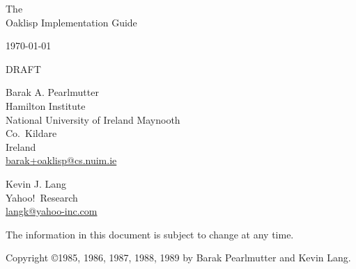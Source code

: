 %
%
%


\begin{titlepage}

\begin{center}

\vspace*{1in}

\Huge
 The \\
 Oaklisp Implementation Guide \\

\vspace{.5in}

\large
 \today \\

\vspace{.25in}

\Huge
 DRAFT \\

\vspace{.5in}

\Large
 Barak A. Pearlmutter \\
\large
 Hamilton Institute\\
 National University of Ireland Maynooth\\
 Co.\ Kildare\\
 Ireland\\
 \url{barak+oaklisp@cs.nuim.ie}

\vspace{.5in}

\Large
 Kevin J. Lang \\
\large
 Yahoo!\ Research \\
 \url{langk@yahoo-inc.com}

\vfill

\vspace{0.25in}

 The information in this document is subject to change at any time.

\end{center}

\end{titlepage}


\thispagestyle{empty}

\vspace*{6in}

\normalsize
\noindent Copyright \copyright 1985, 1986, 1987, 1988, 1989
 by Barak Pearlmutter and Kevin Lang.


\newpage



